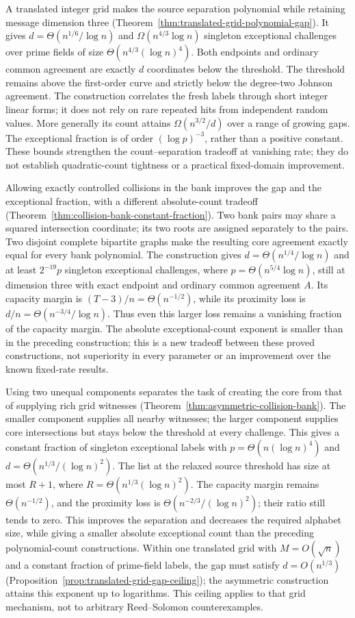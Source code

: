 \documentclass[11pt,letterpaper]{article}
\theoremstyle{definition}
\theoremstyle{remark}
\begin{document}
A translated integer grid makes the source separation polynomial
while retaining message dimension three
(Theorem~\ref{thm:translated-grid-polynomial-gap}). It gives
$d=\Theta(n^{1/6}/\log n)$ and
$\Omega(n^{4/3}\log n)$ singleton exceptional challenges over prime
fields of size $\Theta(n^{4/3}(\log n)^4)$. Both endpoints and ordinary
common agreement are exactly $d$ coordinates below the threshold.
The threshold remains above the first-order curve and strictly below
the degree-two Johnson agreement. The construction correlates the
fresh labels through short integer linear forms; it does not rely on
rare repeated hits from independent random values. More generally its
count attains $\Omega(n^{3/2}/d)$ over a range of growing gaps.
The exceptional fraction is of order $(\log p)^{-3}$, rather than a
positive constant. These bounds strengthen the count--separation
tradeoff at vanishing rate; they do not establish quadratic-count
tightness or a practical fixed-domain improvement.

Allowing exactly controlled collisions in the bank improves the gap
and the exceptional fraction, with a different absolute-count tradeoff
(Theorem~\ref{thm:collision-bank-constant-fraction}). Two bank pairs may
share a squared intersection coordinate; its two roots are assigned
separately to the pairs. Two disjoint complete bipartite graphs make the
resulting core agreement exactly equal for every bank polynomial.
The construction gives $d=\Theta(n^{1/4}/\log n)$ and at least
$2^{-19}p$ singleton exceptional challenges, where
$p=\Theta(n^{5/4}\log n)$, still at dimension three with exact endpoint
and ordinary common agreement $A$. Its capacity margin is
$(T-3)/n=\Theta(n^{-1/2})$, while its proximity loss is
$d/n=\Theta(n^{-3/4}/\log n)$. Thus even this larger loss remains a
vanishing fraction of the capacity margin. The absolute exceptional-count
exponent is smaller than in the preceding construction; this is a new
tradeoff between these proved constructions, not superiority in every
parameter or an improvement over the known fixed-rate results.

Using two unequal components separates the task of creating the core
from that of supplying rich grid witnesses
(Theorem~\ref{thm:asymmetric-collision-bank}). The smaller component
supplies all nearby witnesses; the larger component supplies core
intersections but stays below the threshold at every challenge.
This gives a constant fraction of singleton exceptional labels with
$p=\Theta(n(\log n)^4)$ and
$d=\Theta(n^{1/3}/(\log n)^2)$. The list at the relaxed source threshold
has size at most $R+1$, where $R=\Theta(n^{1/3}(\log n)^2)$.
The capacity margin remains $\Theta(n^{-1/2})$, and the proximity loss
is $\Theta(n^{-2/3}/(\log n)^2)$; their ratio still tends to zero.
This improves the separation and decreases the required alphabet size,
while giving a smaller absolute exceptional count than the preceding
polynomial-count constructions. Within one translated grid with
$M=O(\sqrt n)$ and a constant fraction of prime-field labels, the gap
must satisfy $d=O(n^{1/3})$
(Proposition~\ref{prop:translated-grid-gap-ceiling}); the asymmetric
construction attains this exponent up to logarithms. This ceiling applies
to that grid mechanism, not to arbitrary Reed--Solomon counterexamples.
\end{document}

